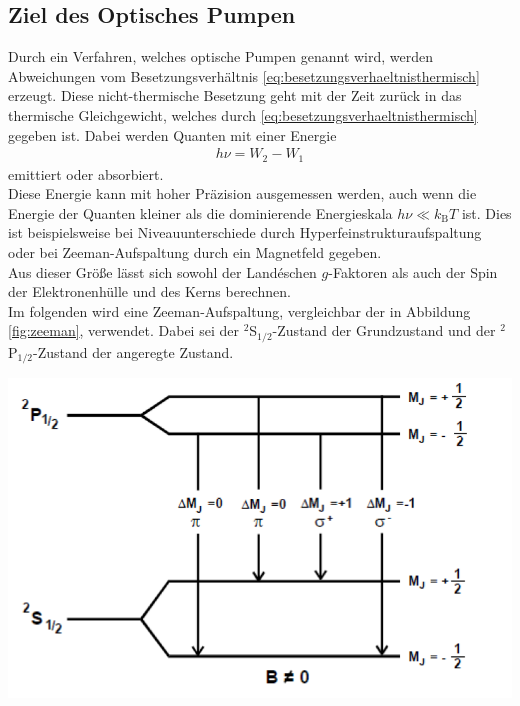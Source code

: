 \documentclass[]{scrartcl}
\begin{document}
\subsection{Ziel des Optisches Pumpen}
Durch ein Verfahren, welches optische Pumpen genannt wird, werden Abweichungen vom Besetzungsverhältnis \ref{eq:besetzungsverhaeltnisthermisch} erzeugt. Diese nicht-thermische Besetzung geht mit der Zeit zurück in das thermische Gleichgewicht, welches durch \ref{eq:besetzungsverhaeltnisthermisch} gegeben ist. Dabei werden Quanten mit einer Energie
\begin{align}
h\nu= W_2 -W_1
\end{align}
emittiert oder absorbiert.\\
Diese Energie kann mit hoher Präzision ausgemessen werden, auch wenn die Energie der Quanten kleiner als die dominierende Energieskala $h\nu \ll k_\text{B}T$ ist. Dies ist beispielsweise bei Niveauunterschiede durch Hyperfeinstrukturaufspaltung oder bei Zeeman-Aufspaltung durch ein Magnetfeld gegeben.\\
Aus dieser Größe lässt sich sowohl der Landéschen $g$-Faktoren als auch der Spin der Elektronenhülle und des Kerns berechnen.\\
Im folgenden wird eine Zeeman-Aufspaltung, vergleichbar der in Abbildung \ref{fig:zeeman}, verwendet. Dabei sei der $^2$S$_{1/2}$-Zustand der Grundzustand und der $^2$P$_{1/2}$-Zustand der angeregte Zustand.
\begin{center}
	\includegraphics[width=\textwidth]{images/zeeman.png}
	\label{fig:zeeman}
\end{center}
\end{document}
